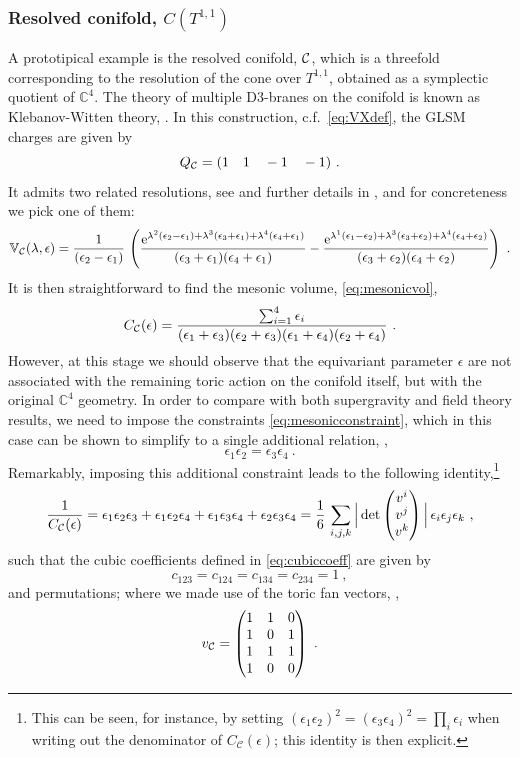 \documentclass[11pt,a4paper]{article}
\def\cC{{\cal C}}
\theoremstyle{definition}
\theoremstyle{identity}
\theoremstyle{remark}
\newcommand{\be}{\begin{equation}}
\newcommand{\ee}{\end{equation}}
\newcommand{\mathe}{\mathrm{e}}
\newcommand{\e}{\epsilon}
\newcommand{\lam}{\lambda}
\newcommand{\BV}{\mathbb{V}}
\newcommand{\BC}{\mathbb{C}}
\begin{document}
\subsubsection*{Resolved conifold, $C (T^{1,1})$}
A prototipical example is the resolved conifold, $\cC$, which is a threefold corresponding to the resolution of the cone over $T^{1,1}$, obtained as a symplectic quotient of $\BC^4$. The theory of multiple D3-branes on the conifold is known as Klebanov-Witten theory, \cite{Klebanov:1998hh}. In this construction, c.f.\ \eqref{eq:VXdef}, the GLSM charges are given by
\be\label{eq:GLSMT11}
    Q_{\cC} = (1 \quad 1\quad -1 \quad -1)\ .
\ee
It admits two related resolutions, see \cite{Cassia:2025aus} and further details in \cite{Hristov:2026zjh}, and for concreteness we pick one of them:
\be\label{V-}
 \BV_\cC (\lam, \e) = \frac1{(\e_2-\e_1)}\, \left(
 \frac{\mathe^{\lam^2 (\e_2-\e_1)+\lam^3 (\e_3+\e_1) +\lam^4 (\e_4+\e_1)}}
 {(\e_3+\e_1) (\e_4+\e_1)}
 - \frac{\mathe^{\lam^1 (\e_1-\e_2)+\lam^3 (\e_3+\e_2) +\lam^4 (\e_4+\e_2)}}
 {(\e_3+\e_2) (\e_4+\e_2)} \right)\ .
\ee
It is then straightforward to find the mesonic volume, \eqref{eq:mesonicvol},
\be
    C_{\cC} (\e) = \frac{\sum_{i=1}^4\e_i}
 {(\e_1+\e_3) (\e_2+\e_3) (\e_1+\e_4) (\e_2+\e_4)}\ .
\ee
However, at this stage we should observe that the equivariant parameter $\e$ are not associated with the remaining toric action on the conifold itself, but with the original $\BC^4$ geometry. In order to compare with both supergravity and field theory results, we need to impose the constraints \eqref{eq:mesonicconstraint}, which in this case can be shown to simplify to a single additional relation, \cite{Cassia:2025aus},
\be
    \e_1 \e_2 = \e_3 \e_4\ .
\ee
Remarkably, imposing this additional constraint leads to the following identity,\footnote{This can be seen, for instance, by setting $(\epsilon_1\epsilon_2)^2=(\epsilon_3\epsilon_4)^2=\prod_i\epsilon_i$ when writing out the denominator of $C_\mathcal{C}(\epsilon)$; this identity is then explicit.}
\be
    \frac1{C_\cC (\e)} = \e_1 \e_2 \e_3 + \e_1 \e_2 \e_4+\e_1 \e_3 \e_4 + \e_2 \e_3 \e_4 = \frac16\, \sum_{i, j, k} \Big| \det \begin{pmatrix} v^i \\ v^j \\v^k \end{pmatrix} \Big|\, \e_i \e_j \e_k\ ,
\ee
such that the cubic coefficients defined in \eqref{eq:cubiccoeff} are given by
\be
    c_{123} = c_{124} = c_{134} = c_{234} = 1\ ,
\ee
and permutations; where we made use of the toric fan vectors, \cite{Cassia:2025aus}, 
\be
 v_\cC =
 \begin{pmatrix}
 1 & 1 & 0 \\
 1 & 0 & 1 \\
 1 & 1 & 1 \\
 1 & 0 & 0
 \end{pmatrix}\ .
\ee
\end{document}
